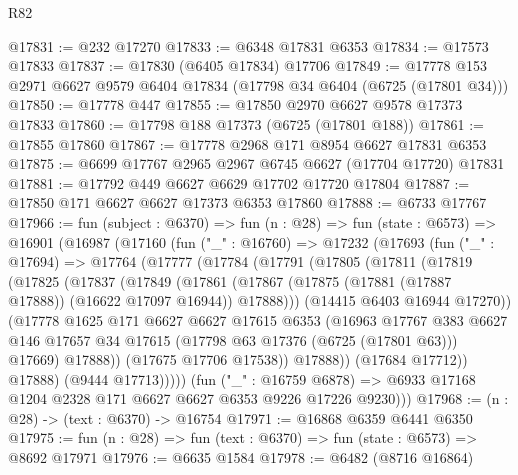 \begin{lexlean}{R82}
\begin{coremodule}
@17831 := @232 @17270
@17833 := @6348 @17831 @6353
@17834 := @17573 @17833
@17837 := @17830 (@6405 @17834) @17706
@17849 := @17778 @153 @2971 @6627 @9579 @6404 @17834 (@17798 @34 @6404 (@6725 (@17801 @34)))
@17850 := @17778 @447
@17855 := @17850 @2970 @6627 @9578 @17373 @17833
@17860 := @17798 @188 @17373 (@6725 (@17801 @188))
@17861 := @17855 @17860
@17867 := @17778 @2968 @171 @8954 @6627 @17831 @6353
@17875 := @6699 @17767 @2965 @2967 @6745 @6627 (@17704 @17720) @17831
@17881 := @17792 @449 @6627 @6629 @17702 @17720 @17804
@17887 := @17850 @171 @6627 @6627 @17373 @6353 @17860
@17888 := @6733 @17767
@17966 := fun (subject : @6370) =>
  fun (n : @28) =>
  fun (state : @6573) =>
  @16901
    (@16987
      (@17160
        (fun ("_" : @16760) =>
        @17232
          (@17693
            (fun ("_" : @17694) =>
            @17764
              (@17777
                (@17784
                  (@17791
                    (@17805
                      (@17811
                        (@17819
                          (@17825
                            (@17837
                              (@17849
                                (@17861
                                  (@17867
                                    (@17875 (@17881 (@17887 @17888)) (@16622 @17097 @16944))
                                    @17888)))
                              (@14415 @6403 @16944 @17270))
                            (@17778
                              @1625
                              @171
                              @6627
                              @6627
                              @17615
                              @6353
                              (@16963
                                @17767
                                @383
                                @6627
                                @146
                                @17657
                                @34
                                @17615
                                (@17798 @63 @17376 (@6725 (@17801 @63)))
                                @17669)
                              @17888))
                          (@17675 @17706 @17538))
                        @17888))
                    (@17684 @17712))
                  @17888)
                (@9444 @17713)))))
        (fun ("_" : @16759 @6878) =>
        @6933 @17168 @1204 @2328 @171 @6627 @6627 @6353 @9226 @17226 @9230)))
@17968 := (n : @28) -> (text : @6370) -> @16754
@17971 := @16868 @6359 @6441 @6350
@17975 := fun (n : @28) => fun (text : @6370) => fun (state : @6573) => @8692 @17971
@17976 := @6635 @1584
@17978 := @6482 (@8716 @16864)

\end{coremodule}
\end{lexlean}
